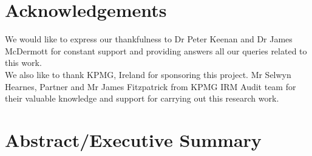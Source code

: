 \documentclass[a4paper,12pt,bibtotoc,notitlepage,oneside]{book}
\numberwithin{equation}{section}  %
\numberwithin{figure}{chapter}    %
\begin{document}




\chapter*{Acknowledgements}
We would like to express our thankfulness to Dr Peter Keenan and Dr James McDermott for constant support and providing answers all our queries related to this work.\\

We also like to thank KPMG, Ireland for sponsoring this project. Mr Selwyn Hearnes, Partner and Mr James Fitzpatrick from KPMG IRM Audit team for their valuable knowledge and support for carrying out this research work.



\chapter*{Abstract/Executive Summary}


\mainmatter

\linespread{1.3} %










\end{document}
